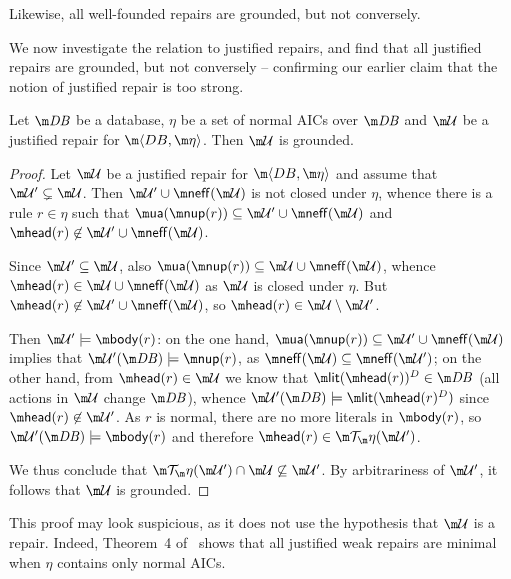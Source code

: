 {Likewise, all well-founded repairs are grounded, but not conversely.

We now investigate the relation to justified repairs, and find that all justified repairs are grounded, but not conversely -- confirming our earlier claim that the notion of justified repair is too strong.

\begin{lemma}
  \label{lem:justified}
  Let $\db$ be a database, $\eta$ be a set of normal AICs over $\db$ and $\UU$ be a justified repair for $\fulldb$.
  Then $\UU$ is grounded.
\end{lemma}
\begin{proof}
  Let $\UU$ be a justified repair for $\fulldb$ and assume that $\UU'\subsetneq\UU$.
  Then $\UU'\cup\neff(\UU)$ is not closed under $\eta$, whence there is a rule $r\in\eta$ such that $\actof(\nup(r))\subseteq\UU'\cup\neff(\UU)$ and $\head(r)\not\in\UU'\cup\neff(\UU)$.

  Since $\UU'\subseteq\UU$, also $\actof(\nup(r))\subseteq\UU\cup\neff(\UU)$, whence $\head(r)\in\UU\cup\neff(\UU)$ as $\UU$ is closed under $\eta$.
  But $\head(r)\not\in\UU'\cup\neff(\UU)$, so $\head(r)\in\UU\setminus\UU'$.

  Then $\UU'\models\body(r)$: on the one hand, $\actof(\nup(r))\subseteq\UU'\cup\neff(\UU)$ implies that $\UU'(\db)\models\nup(r)$, as $\neff(\UU)\subseteq\neff(\UU')$; on the other hand, from $\head(r)\in\UU$ we know that $\litof(\head(r))^D\in\db$ (all actions in $\UU$ change $\db$), whence $\UU'(\db)\models\litof(\head(r)^D)$ since $\head(r)\not\in\UU'$.
  As $r$ is normal, there are no more literals in $\body(r)$, so $\UU'(\db)\models\body(r)$ and therefore $\head(r)\in\Op(\UU')$.

  We thus conclude that $\Op(\UU')\cap\UU\not\subseteq\UU'$.
  By arbitrariness of $\UU'$, it follows that $\UU$ is grounded.
\end{proof}
This proof may look suspicious, as it does not use the hypothesis that $\UU$ is a repair.
Indeed, Theorem~4 of~\cite{Caroprese2011} shows that all justified weak repairs are minimal when $\eta$ contains only normal AICs.

}
